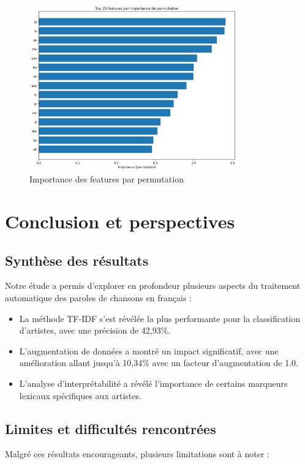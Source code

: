 \documentclass[a4paper,11pt]{article}
\begin{document}
\begin{figure}[ht]
    \centering
    \includegraphics[width=0.8\textwidth]{results_rapport/permutation_importance.png}
    \caption{Importance des features par permutation}
    \label{fig:permutation-importance}
\end{figure}

\section{Conclusion et perspectives}
\label{sec:conclusion}

\subsection{Synthèse des résultats}
Notre étude a permis d'explorer en profondeur plusieurs aspects du traitement automatique des paroles de chansons en français :

\begin{itemize}
    \item La méthode TF-IDF s'est révélée la plus performante pour la classification d'artistes, avec une précision de 42,93\%.
    \item L'augmentation de données a montré un impact significatif, avec une amélioration allant jusqu'à 10,34\% avec un facteur d'augmentation de 1.0.
    \item L'analyse d'interprétabilité a révélé l'importance de certains marqueurs lexicaux spécifiques aux artistes.
\end{itemize}

\subsection{Limites et difficultés rencontrées}
Malgré ces résultats encourageants, plusieurs limitations sont à noter :
\end{document}
